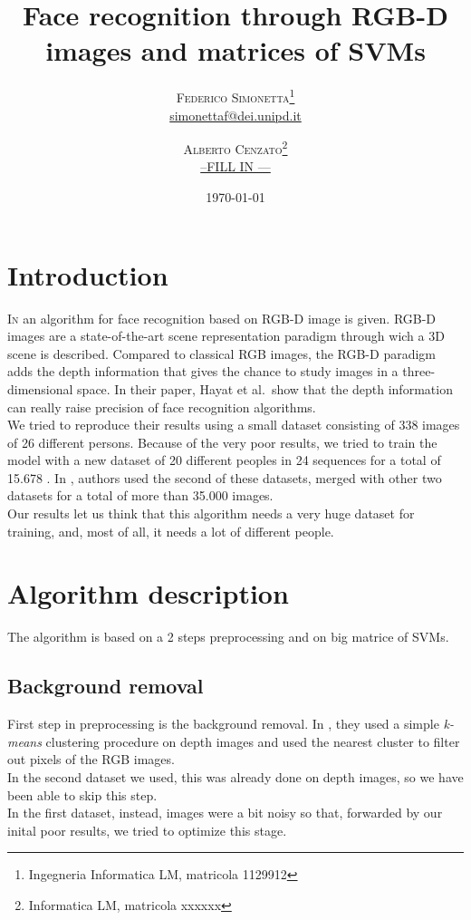 \documentclass{article}
\title{Face recognition through RGB-D images and matrices of SVMs} %
\author{%
	\textsc{Federico Simonetta}\thanks{Ingegneria Informatica LM, matricola 1129912} \\[1ex] %
	\normalsize \href{mailto:simonettaf@dei.unipd.it}{simonettaf@dei.unipd.it} %
	\and %
	\textsc{Alberto Cenzato}\thanks{Informatica LM, matricola xxxxxx} \\[1ex] %
	\normalsize \href{mailto:john@smith.com}{--FILL IN ---} %
}
\date{\today} %
\begin{document}
\Huge
\bfseries
\maketitle
\mdseries
\normalsize

\section{Introduction}

\lettrine[nindent=0em,lines=2]{I}n \citep{Hayat2016} an algorithm for face
recognition based on RGB-D image is given. RGB-D images are a state-of-the-art
scene representation paradigm through wich a 3D scene is described. Compared to
classical RGB images, the RGB-D paradigm adds the depth information that gives
the chance to study images in a three-dimensional space. In their paper, Hayat
et al.\ show that the depth information can really raise precision of face
recognition algorithms.
\\
We tried to reproduce their results using a small dataset consisting of 338
images of 26 different persons. Because of the very poor results, we tried to
train the model with a new dataset of 20 different peoples in 24 sequences for
a total of 15.678 \citep{Fanelli2013}. In \citep{Hayat2016}, authors used the
second of these datasets, merged with other two datasets for a total of more
than 35.000 images.  \\ Our results let us think that this algorithm needs a
very huge dataset for training, and, most of all, it needs a lot of different
people.

\section{Algorithm description}
The algorithm is based on a 2 steps preprocessing and on big matrice of SVMs.

\subsection{Background removal}
\label{sec:background}
First step in preprocessing is the background removal. In \cite{Hayat2016},
they used a simple \textit{k-means} clustering procedure on depth images and
used the nearest cluster to filter out pixels of the RGB images.
\\
In the second dataset we used, this was already done on depth images, so we
have been able to skip this step.
\\
In the first dataset, instead, images were a bit noisy so that, forwarded by
our inital poor results, we tried to optimize this stage.
\end{document}
